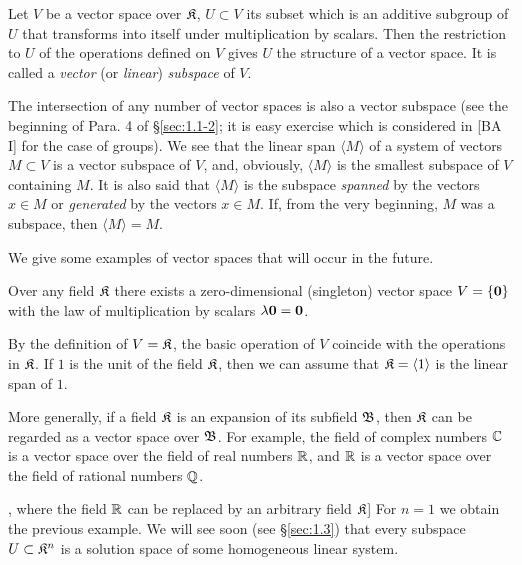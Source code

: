 \begin{definition}
	Let $V$ be a vector space over ${\mathfrak{K}}$, $U\subset V$ its subset which is an additive subgroup of $U$ that transforms into itself under multiplication by scalars. Then the restriction to $U$ of the operations defined on $V$ gives $U$ the structure of a vector space. It is called a \textit{vector} (or \textit{linear}) \textit{subspace} of $V$.
\end{definition}

The intersection of any number of vector spaces is also a vector subspace (see the beginning of Para. 4 of \S\ref{sec:1.1-2}; it is easy exercise which is considered in [BA I] for the case of groups). We see that the linear span $\langle M\rangle$ of a system of vectors $M\subset V$ is a vector subspace of $V$, and, obviously, $\langle M\rangle$ is the smallest subspace of $V$ containing $M$. It is also said that $\langle M\rangle$ is the subspace \textit{spanned} by the vectors $x\in M$ or \textit{generated} by the vectors $x\in M$. If, from the very beginning, $M$ was a subspace, then $\langle M\rangle = M$.

We give some examples of vector spaces that will occur in the future.

\begin{example}
	Over any field ${\mathfrak{K}}$ there exists a zero-dimensional (singleton) vector space $V = \{\v0\}$ with the law of multiplication by scalars $\lambda \v0 = \v0$.
\end{example}

\begin{example}\label{ex:base-field-space}
	By the definition of $V={\mathfrak{K}}$, the basic operation of $V$ coincide with the operations in ${\mathfrak{K}}$. If $1$ is the unit of the field ${\mathfrak{K}}$, then we can assume that ${\mathfrak{K}} = \langle 1\rangle$ is the linear span of $1$.
	
	More generally, if a field ${\mathfrak{K}}$ is an expansion of its subfield ${\mathfrak{B}}$, then ${\mathfrak{K}}$ can be regarded as a vector space over ${\mathfrak{B}}$. For example, the field of complex numbers ${\mathbb{C}}$ is a vector space over the field of real numbers ${\mathbb{R}}$, and ${\mathbb{R}}$ is a vector space over the field of rational numbers ${\mathbb{Q}}$.
\end{example}

\begin{example}[the $n$-dimensional coordinate space ${\fK}^n$; see [BA I, Ch. 2], where the field ${\mathbb{R}}$ can be replaced by an arbitrary field ${\mathfrak{K}}$]
	For $n = 1$ we obtain the previous example. We will see soon (see \S\ref{sec:1.3}) that every subspace $U\subset {{\mathfrak{K}}}^n$ is a solution space of some homogeneous linear system.
\end{example}

